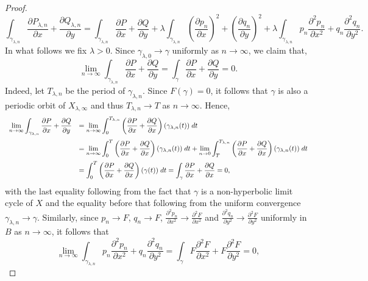 \documentclass[11pt]{amsart}
\begin{document}
\begin{proof}
\begin{equation}
	\int_{\gamma_{\lambda,n}}\frac{\partial P_{\lambda,n}}{\partial x}+\frac{\partial Q_{\lambda,n}}{\partial y}=\int_{\gamma_{\lambda,n}}\frac{\partial P}{\partial x}+\frac{\partial Q}{\partial y}+\lambda\int_{\gamma_{\lambda,n}}\left(\frac{\partial p_n}{\partial x}\right)^2+\left(\frac{\partial q_n}{\partial y}\right)^2+\lambda\int_{\gamma_{\lambda,n}} p_n\frac{\partial^2p_n}{\partial x^2}+q_n\frac{\partial^2 q_n}{\partial y^2}.
\end{equation}
In what follows we fix $\lambda>0$. Since $\gamma_{\lambda,0}\to\gamma$ uniformly as $n\to\infty$, we claim that,
	\[\lim\limits_{n\to\infty}\int_{\gamma_{\lambda,n}}\frac{\partial P}{\partial x}+\frac{\partial Q}{\partial y}=\int_{\gamma}\frac{\partial P}{\partial x}+\frac{\partial Q}{\partial y}=0.\]
Indeed, let $T_{\lambda,n}$ be the period of $\gamma_{\lambda,n}$. Since $F(\gamma)=0$, it follows that $\gamma$ is also a periodic orbit of $X_{\lambda,\infty}$ and thus $T_{\lambda,n}\to T$ as $n\to\infty$. Hence,
	\[\begin{array}{rl}
		\displaystyle \lim\limits_{n\to\infty}\int_{\gamma_{\lambda,n}}\frac{\partial P}{\partial x}+\frac{\partial Q}{\partial y} &\displaystyle= \lim\limits_{n\to\infty}\int_{0}^{T_{\lambda,n}}\left(\frac{\partial P}{\partial x}+\frac{\partial Q}{\partial x}\right)(\gamma_{\lambda,n}(t))\;dt \vspace{0.2cm} \\
		&\displaystyle= \lim\limits_{n\to\infty}\int_{0}^{T}\left(\frac{\partial P}{\partial x}+\frac{\partial Q}{\partial x}\right)(\gamma_{\lambda,n}(t))\;dt+\lim\limits_{n\to0}\int_{T}^{T_{\lambda,n}}\left(\frac{\partial P}{\partial x}+\frac{\partial Q}{\partial x}\right)(\gamma_{\lambda,n}(t))\;dt\vspace{0.2cm} \\
		&\displaystyle=\int_{0}^{T}\left(\frac{\partial P}{\partial x}+\frac{\partial Q}{\partial x}\right)(\gamma(t))\;dt=\int_{\gamma}\frac{\partial P}{\partial x}+\frac{\partial Q}{\partial x}=0,
	\end{array}\]
with the last equality following from the fact that $\gamma$ is a non-hyperbolic limit cycle of $X$ and the equality before that following from the uniform convergence $\gamma_{\lambda,n}\to\gamma$. Similarly, since $p_n\to F$, $q_n\to F$, $\frac{\partial^2p_n}{\partial x^2}\to\frac{\partial^2F}{\partial x^2}$ and $\frac{\partial^2q_n}{\partial y^2}\to\frac{\partial^2F}{\partial y^2}$ uniformly in $B$ as $n\to\infty$, it follows that
	\[\lim\limits_{n\to\infty}\int_{\gamma_{\lambda,n}} p_n\frac{\partial^2p_n}{\partial x^2}+q_n\frac{\partial^2 q_n}{\partial y^2}=\int_{\gamma}F\frac{\partial^2 F}{\partial x^2}+F\frac{\partial^2 F}{\partial y^2}=0,\]

\end{proof}
\end{document}
